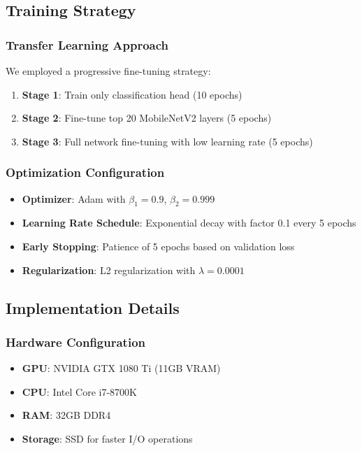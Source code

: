 \documentclass[conference,10pt,letterpaper]{IEEEtran}
\begin{document}
\subsection{Training Strategy}

\subsubsection{Transfer Learning Approach}
We employed a progressive fine-tuning strategy:
\begin{enumerate}
\item \textbf{Stage 1}: Train only classification head (10 epochs)
\item \textbf{Stage 2}: Fine-tune top 20 MobileNetV2 layers (5 epochs)
\item \textbf{Stage 3}: Full network fine-tuning with low learning rate (5 epochs)
\end{enumerate}

\subsubsection{Optimization Configuration}
\begin{itemize}
\item \textbf{Optimizer}: Adam with $\beta_1 = 0.9$, $\beta_2 = 0.999$
\item \textbf{Learning Rate Schedule}: Exponential decay with factor 0.1 every 5 epochs
\item \textbf{Early Stopping}: Patience of 5 epochs based on validation loss
\item \textbf{Regularization}: L2 regularization with $\lambda = 0.0001$
\end{itemize}

\subsection{Implementation Details}

\subsubsection{Hardware Configuration}
\begin{itemize}
\item \textbf{GPU}: NVIDIA GTX 1080 Ti (11GB VRAM)
\item \textbf{CPU}: Intel Core i7-8700K
\item \textbf{RAM}: 32GB DDR4
\item \textbf{Storage}: SSD for faster I/O operations
\end{itemize}
\end{document}
